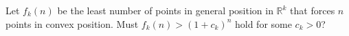 Let \(f_k(n)\) be the least number of points in general position in
\(\mathbb R^k\) that forces \(n\) points in convex position.
Must \(f_k(n)>(1+c_k)^n\) hold for some \(c_k>0\)?
